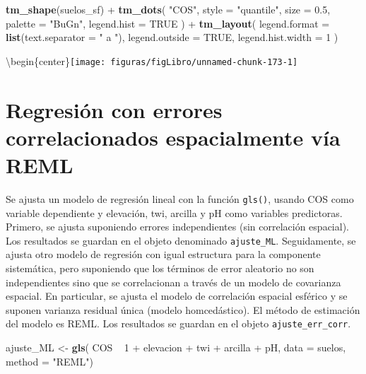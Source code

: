 \documentclass[11pt,b5paper,]{krantz}
\newenvironment{Shaded}{}{}
\newcommand{\DataTypeTok}[1]{\textcolor[rgb]{0.56,0.13,0.00}{#1}}
\newcommand{\DecValTok}[1]{\textcolor[rgb]{0.25,0.63,0.44}{#1}}
\newcommand{\FloatTok}[1]{\textcolor[rgb]{0.25,0.63,0.44}{#1}}
\newcommand{\KeywordTok}[1]{\textcolor[rgb]{0.00,0.44,0.13}{\textbf{#1}}}
\newcommand{\NormalTok}[1]{#1}
\newcommand{\OperatorTok}[1]{\textcolor[rgb]{0.40,0.40,0.40}{#1}}
\newcommand{\OtherTok}[1]{\textcolor[rgb]{0.00,0.44,0.13}{#1}}
\newcommand{\StringTok}[1]{\textcolor[rgb]{0.25,0.44,0.63}{#1}}
\begin{document}
\begin{Shaded}
\begin{Highlighting}[]
\KeywordTok{tm_shape}\NormalTok{(suelos_sf) }\OperatorTok{+}
\StringTok{  }\KeywordTok{tm_dots}\NormalTok{(}
    \StringTok{"COS"}\NormalTok{,}
    \DataTypeTok{style =} \StringTok{"quantile"}\NormalTok{,}
    \DataTypeTok{size =} \FloatTok{0.5}\NormalTok{,}
    \DataTypeTok{palette =} \StringTok{"BuGn"}\NormalTok{,}
    \DataTypeTok{legend.hist =} \OtherTok{TRUE}
\NormalTok{  ) }\OperatorTok{+}
\StringTok{  }\KeywordTok{tm_layout}\NormalTok{(}
    \DataTypeTok{legend.format =} \KeywordTok{list}\NormalTok{(}\DataTypeTok{text.separator =} \StringTok{" a "}\NormalTok{),}
    \DataTypeTok{legend.outside =} \OtherTok{TRUE}\NormalTok{,}
    \DataTypeTok{legend.hist.width =} \DecValTok{1}
\NormalTok{  )}
\end{Highlighting}
\end{Shaded}

\textbackslash{}begin\{center\}\texttt{[image: figuras/figLibro/unnamed-chunk-173-1]}

\hypertarget{regresiuxf3n-con-errores-correlacionados-espacialmente-vuxeda-reml-1}{%
\section{Regresión con errores correlacionados espacialmente vía REML}\label{regresiuxf3n-con-errores-correlacionados-espacialmente-vuxeda-reml-1}}

Se ajusta un modelo de regresión lineal con la función \texttt{gls()}, usando COS como variable dependiente y elevación, twi, arcilla y pH como variables predictoras. Primero, se ajusta suponiendo errores independientes (sin correlación espacial). Los resultados se guardan en el objeto denominado \texttt{ajuste\_ML}. Seguidamente, se ajusta otro modelo de regresión con igual estructura para la componente sistemática, pero suponiendo que los términos de error aleatorio no son independientes sino que se correlacionan a través de un modelo de covarianza espacial. En particular, se ajusta el modelo de correlación espacial esférico y se suponen varianza residual única (modelo homcedástico). El método de estimación del modelo es REML. Los resultados se guardan en el objeto \texttt{ajuste\_err\_corr}.

\begin{Shaded}
\begin{Highlighting}[]
\NormalTok{ajuste_ML <-}\StringTok{ }\KeywordTok{gls}\NormalTok{(}
\NormalTok{  COS }\OperatorTok{~}\StringTok{ }\DecValTok{1} \OperatorTok{+}\StringTok{ }\NormalTok{elevacion }\OperatorTok{+}\StringTok{ }\NormalTok{twi }\OperatorTok{+}\StringTok{ }\NormalTok{arcilla }\OperatorTok{+}\StringTok{ }\NormalTok{pH,}
  \DataTypeTok{data =}\NormalTok{ suelos,}
  \DataTypeTok{method =} \StringTok{"REML"}\NormalTok{)}
\end{Highlighting}
\end{Shaded}
\end{document}
